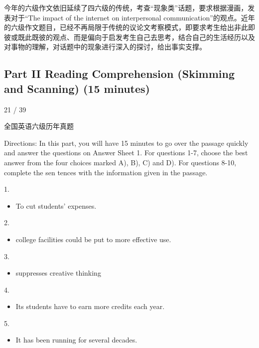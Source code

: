 \documentclass[UTF8,11pt]{ctexart}
\begin{document}
今年的六级作文依旧延续了四六级的传统，考查“现象类”话题，要求根据漫画，发表对于“The impact of the internet on interpersonal communication”的观点。近年的六级作文题目，已经不再局限于传统的议论文考察模式，即要求考生给出非此即彼或既此既彼的观点、而是偏向于启发考生自己去思考，结合自己的生活经历以及对事物的理解，对话题中的现象进行深入的探讨，给出事实支撑。


\subsection*{\textbf{Part II} \textbf{Reading Comprehension (Skimming and Scanning)} \textbf{(15 minutes)}}


21 / 39


全国英语六级历年真题


Directions: In this part, you will have 15 minutes to go over the passage quickly and answer the questions on Answer Sheet 1. For questions 1-7, choose the best answer from the four choices marked A), B), C) and D). For questions 8-10, complete the sen tences with the information given in the passage.


1.


\begin{itemize}[leftmargin=2em,itemsep=.2em,topsep=.4em]\item[A.] To cut students’ expenses.
\end{itemize}

2.


\begin{itemize}[leftmargin=2em,itemsep=.2em,topsep=.4em]\item[B.] college facilities could be put to more effective use.
\end{itemize}

3.


\begin{itemize}[leftmargin=2em,itemsep=.2em,topsep=.4em]\item[C.] suppresses creative thinking
\end{itemize}

4.


\begin{itemize}[leftmargin=2em,itemsep=.2em,topsep=.4em]\item[A.] Its students have to earn more credits each year.
\end{itemize}

5.


\begin{itemize}[leftmargin=2em,itemsep=.2em,topsep=.4em]\item[B.] It has been running for several decades.
\end{itemize}
\end{document}

